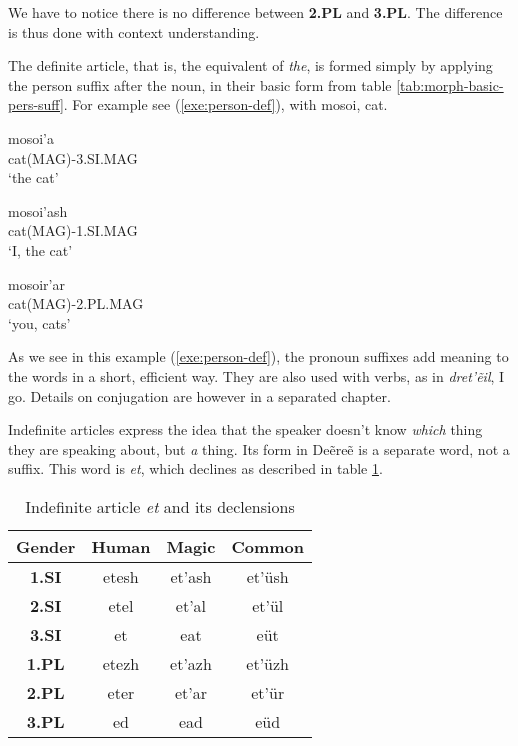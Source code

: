 We have to notice there is no difference between \textbf{2.PL} and \textbf{3.PL}. The difference is
thus done with context understanding.

The definite article, that is, the equivalent of \emph{the}, is formed simply by applying the person
suffix after the noun, in their basic form from table \ref{tab:morph-basic-pers-suff}. For example
see (\ref{exe:person-def}), with \gls{mosoi}, cat.

\begin{exe}
\ex\label{exe:person-def}
\begin{xlist}
\ex\gll mosoi’a\\
cat(MAG)-3.SI.MAG\\
\trans ‘the cat’

\ex\gll mosoi’ash\\
cat(MAG)-1.SI.MAG\\
\trans ‘I, the cat’

\ex\gll mosoir’ar\\
cat(MAG)-2.PL.MAG\\
\trans ‘you, cats’
\end{xlist}
\end{exe}

As we see in this example (\ref{exe:person-def}), the pronoun suffixes add meaning to the words in a
short, efficient way. They are also used with verbs, as in \emph{dret’ẽil}, I go. Details on
conjugation are however in a separated chapter.

Indefinite articles express the idea that the speaker doesn’t know \emph{which} thing they are
speaking about, but \emph{a} thing. Its form in Deẽreẽ is a separate word, not a suffix. This word
is \emph{et}, which declines as described in table \ref{tab:morph-indef-pers-suff}.

\begin{table}[h]
\begin{center}\label{tab:morph-indef-pers-suff}
\begin{tabular}{|c||c|c|c|}
\hline
\textbf{Gender} & \textbf{Human} & \textbf{Magic} & \textbf{Common}\\\hline
\textbf{1.SI}                    & etesh & et’ash & et’üsh \\\hline
\textbf{2.SI}                    & etel  & et’al  & et’ül  \\\hline
\textbf{3.SI}                    & et    & eat    & eüt    \\\hline
\textbf{1.PL}                    & etezh & et’azh & et’üzh \\\hline
\textbf{2.PL}                    & eter  & et’ar  & et’ür  \\\hline
\textbf{3.PL}                    & ed    & ead    & eüd    \\\hline
\end{tabular}
\end{center}
\caption{Indefinite article \emph{et} and its declensions}
\end{table}

